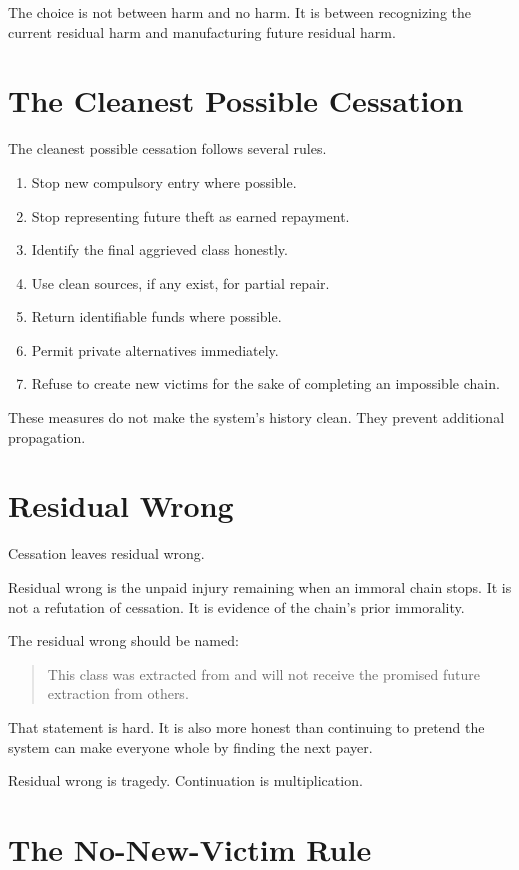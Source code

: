 \documentclass[12pt]{article}
\begin{document}
The choice is not between harm and no harm. It is between recognizing the current residual harm and manufacturing future residual harm.

\section{The Cleanest Possible Cessation}

The cleanest possible cessation follows several rules.

\begin{enumerate}
  \item Stop new compulsory entry where possible.
  \item Stop representing future theft as earned repayment.
  \item Identify the final aggrieved class honestly.
  \item Use clean sources, if any exist, for partial repair.
  \item Return identifiable funds where possible.
  \item Permit private alternatives immediately.
  \item Refuse to create new victims for the sake of completing an impossible chain.
\end{enumerate}

These measures do not make the system's history clean. They prevent additional propagation.

\section{Residual Wrong}

Cessation leaves residual wrong.

Residual wrong is the unpaid injury remaining when an immoral chain stops. It is not a refutation of cessation. It is evidence of the chain's prior immorality.

The residual wrong should be named:

\begin{quote}
This class was extracted from and will not receive the promised future extraction from others.
\end{quote}

That statement is hard. It is also more honest than continuing to pretend the system can make everyone whole by finding the next payer.

Residual wrong is tragedy. Continuation is multiplication.

\section{The No-New-Victim Rule}
\end{document}

